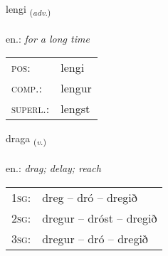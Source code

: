 \documentclass[frontgrid, backgrid]{flacards}\usepackage[]{graphicx}\usepackage[]{xcolor}
\begin{document}
\renewcommand{\blhead}{\vskip5pt {\small\bfseries\footnotesize Atviksorð | Adverb }}
\renewcommand{\bcfoot}{\vskip5pt \hspace{2pt}{\small\bfseries\footnotesize 1K}}


{lengi \small{\textsubscript{(\textit{adv.})}} \\[1ex] %
\textphonetic{[leiɲcɪ]} \\
en.: \emph{for a long time} \\  [2ex]
\renewcommand*{\arraystretch}{0.8}
\begin{tabular}{ll}
\textsc{pos}: & lengi \\ 
\textsc{comp.}: & lengur \\ 
\textsc{superl.}: & lengst \\
\end{tabular}
}

\renewcommand{\flhead}{\vskip5pt \fboxsep=0pt {\small\bfseries\footnotesize Sagnorð | Verb}}
\renewcommand{\fcfoot}{\vskip5pt \fboxsep=0pt \hspace{2pt}{\small\bfseries\footnotesize 1K}}

\renewcommand{\blhead}{\vskip5pt {\small\bfseries\footnotesize Sagnorð | Verb }}
\renewcommand{\bcfoot}{\vskip5pt \hspace{2pt}{\small\bfseries\footnotesize 1K}}


{draga \small{\textsubscript{(\textit{v.})}} \\[1ex] %
\textphonetic{[traːɣa]} \\
en.: \emph{drag; delay; reach} \\  [2ex]
\renewcommand*{\arraystretch}{0.8}
\begin{tabular}{p{1cm}l}
\textsc{1sg}: & dreg -- dró -- dregið \\ 
\textsc{2sg}: & dregur -- dróst -- dregið \\ 
\textsc{3sg}: & dregur -- dró -- dregið \\ 
\end{tabular}
}

\renewcommand{\flhead}{\vskip5pt \fboxsep=0pt {\small\bfseries\footnotesize Nafnorð | Noun}}
\renewcommand{\fcfoot}{\vskip5pt \fboxsep=0pt \hspace{2pt}{\small\bfseries\footnotesize 1K}}
\end{document}
